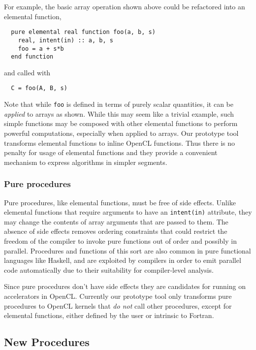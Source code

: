 For example, the basic array operation shown above could be refactored into an
elemental function,

{\small
\begin{verbatim}
  pure elemental real function foo(a, b, s)
    real, intent(in) :: a, b, s
    foo = a + s*b
  end function
\end{verbatim}
}

\noindent and called with

{\small
\begin{verbatim}
  C = foo(A, B, s)
\end{verbatim}
}

Note that while {\tt foo} is defined in terms of purely scalar quantities, it
can be \emph{applied} to arrays as shown.  While this may seem like a trivial
example, such simple functions may be composed with other elemental functions to
perform powerful computations, especially when applied to arrays.  Our prototype
tool transforms elemental functions to inline OpenCL functions.  Thus there is
no penalty for usage of elemental functions and they provide a convenient
mechanism to express algorithms in simpler segments.

\subsubsection*{Pure procedures}

Pure procedures, like elemental functions, must be free of side effects.  Unlike
elemental functions that require arguments to have an {\tt intent(in)}
attribute, they may change the contents of array arguments that are passed to
them.  The absence of side effects removes ordering constraints that could
restrict the freedom of the compiler to invoke pure functions out of order and
possibly in parallel.  Procedures and functions of this sort are also common in
pure functional languages like Haskell, and are exploited by compilers in order
to emit parallel code automatically due to their suitability for compiler-level
analysis.

Since pure procedures don't have side effects they are candidates for running on
accelerators in OpenCL.  Currently our prototype tool only transforms pure procedures
to OpenCL kernels that \emph{do not} call other procedures, except for elemental
functions, either defined by the user or intrinsic to Fortran.

\subsection{New Procedures}

